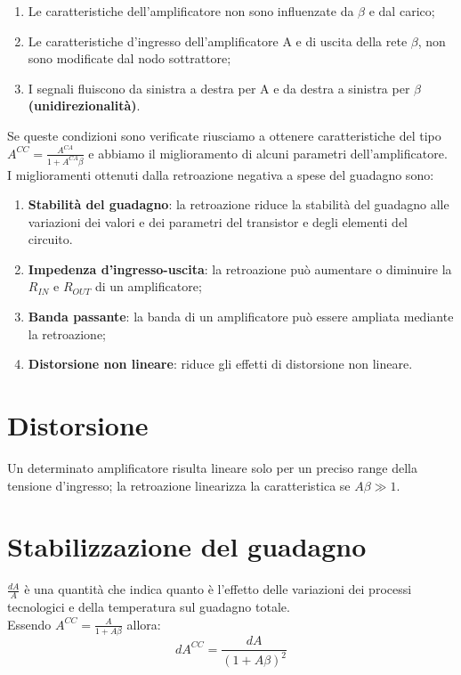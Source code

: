 \documentclass[a4paper, 12pt]{book}
\begin{document}
\begin{enumerate}
    \item Le caratteristiche dell'amplificatore non sono influenzate da $\beta$ e dal carico;
    \item Le caratteristiche d'ingresso dell'amplificatore A e di uscita della rete $\beta$, non sono modificate dal nodo sottrattore;
    \item I segnali fluiscono da sinistra a destra per A e da destra a sinistra per $\beta$ \textbf{(unidirezionalità)}.
\end{enumerate}
Se queste condizioni sono verificate riusciamo a ottenere caratteristiche del tipo $A^{CC} = \frac{A^{CA}}{1+A^{CA}\beta}$ e abbiamo il miglioramento di alcuni parametri dell'amplificatore.
\\I miglioramenti ottenuti dalla retroazione negativa a spese del guadagno sono:
\begin{enumerate}
    \item \textbf{Stabilità del guadagno}: la retroazione riduce la stabilità del guadagno alle variazioni dei valori e dei parametri del transistor e degli elementi del circuito.
    \item \textbf{Impedenza d'ingresso-uscita}: la retroazione può aumentare o diminuire la $R_{IN}$ e $R_{OUT}$ di un amplificatore;
    \item \textbf{Banda passante}: la banda di un amplificatore può essere ampliata mediante la retroazione;
    \item \textbf{Distorsione non lineare}: riduce gli effetti di distorsione non lineare.
\end{enumerate}

\section*{Distorsione}
Un determinato amplificatore risulta lineare solo per un preciso range della tensione d'ingresso; la retroazione linearizza la caratteristica se $A\beta\gg1$.

\section*{Stabilizzazione del guadagno}
$\frac{dA}{A}$ è una quantità che indica quanto è l'effetto delle variazioni dei processi tecnologici e della temperatura sul guadagno totale.
\\Essendo $A^{CC} = \frac{A}{1+A\beta}$ allora:
\begin{equation*}
    dA^{CC}=\frac{dA}{(1+A\beta)^2}
\end{equation*}
\end{document}
